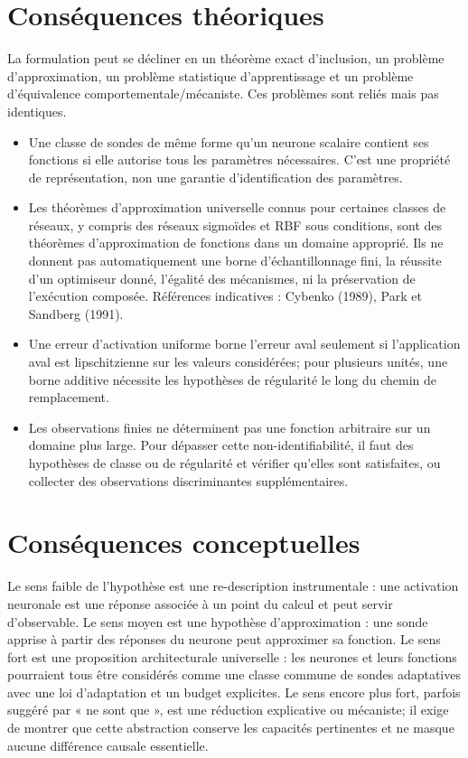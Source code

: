 \documentclass[11pt,a4paper,oneside]{report}
\begin{document}
\section{Conséquences théoriques}
La formulation peut se décliner en un théorème exact d'inclusion, un problème d'approximation, un problème statistique d'apprentissage et un problème d'équivalence comportementale/mécaniste. Ces problèmes sont reliés mais pas identiques.
\begin{itemize}
\item Une classe de sondes de même forme qu'un neurone scalaire contient ses fonctions si elle autorise tous les paramètres nécessaires. C'est une propriété de représentation, non une garantie d'identification des paramètres.
\item Les théorèmes d'approximation universelle connus pour certaines classes de réseaux, y compris des réseaux sigmoïdes et RBF sous conditions, sont des théorèmes d'approximation de fonctions dans un domaine approprié. Ils ne donnent pas automatiquement une borne d'échantillonnage fini, la réussite d'un optimiseur donné, l'égalité des mécanismes, ni la préservation de l'exécution composée. Références indicatives : Cybenko (1989), Park et Sandberg (1991).
\item Une erreur d'activation uniforme borne l'erreur aval seulement si l'application aval est lipschitzienne sur les valeurs considérées; pour plusieurs unités, une borne additive nécessite les hypothèses de régularité le long du chemin de remplacement.
\item Les observations finies ne déterminent pas une fonction arbitraire sur un domaine plus large. Pour dépasser cette non-identifiabilité, il faut des hypothèses de classe ou de régularité et vérifier qu'elles sont satisfaites, ou collecter des observations discriminantes supplémentaires.
\end{itemize}

\section{Conséquences conceptuelles}
Le sens faible de l'hypothèse est une re-description instrumentale : une activation neuronale est une réponse associée à un point du calcul et peut servir d'observable. Le sens moyen est une hypothèse d'approximation : une sonde apprise à partir des réponses du neurone peut approximer sa fonction. Le sens fort est une proposition architecturale universelle : les neurones et leurs fonctions pourraient tous être considérés comme une classe commune de sondes adaptatives avec une loi d'adaptation et un budget explicites. Le sens encore plus fort, parfois suggéré par « ne sont que », est une réduction explicative ou mécaniste; il exige de montrer que cette abstraction conserve les capacités pertinentes et ne masque aucune différence causale essentielle.
\end{document}
